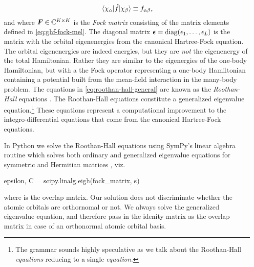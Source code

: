             \begin{align}
                \mel*{\chi_{\alpha}}{\hat{f}}{\chi_{\beta}}
                \equiv f_{\alpha \beta},
                \label{eq:ghf-fock-mel}
            \end{align}
            and where $\boldsymbol{F} \in \mathbb{C}^{K \times K}$ is the \emph{Fock
            matrix} consisting of the matrix elements defined in
            \autoref{eq:ghf-fock-mel}.
            The diagonal matrix $\boldsymbol{\epsilon} = \operatorname{diag}(\epsilon_1, \dots,
            \epsilon_L)$ is the matrix with the orbital eigenenergies from the
            canonical Hartree-Fock equation.
            The orbital eigenenergies are indeed energies, but they are
            \emph{not} the eigenenergy of the total Hamiltonian.
            Rather they are similar to the eigenergies of the one-body
            Hamiltonian, but with a the Fock operator representing a one-body
            Hamiltonian containing a potential built from the mean-field
            interaction in the many-body problem.
            The equations in \autoref{eq:roothan-hall-general} are known as the
            \emph{Roothan-Hall} equations \cite{roothan, hall}.
            The Roothan-Hall equations constitute a generalized eigenvalue
            equation.\footnote{%
                The grammar sounds highly speculative as we talk about the
                Roothan-Hall \emph{equations} reducing to a single
                \emph{equation}.
            }
            These equations represent a computational improvement to the
            integro-differential equations that come from the canonical
            Hartree-Fock equations.

            In Python we solve the Roothan-Hall equations using SymPy's linear
            algebra routine  which solves both ordinary
            and generalized eigenvalue equations for symmetric and Hermitian
            matrices \cite{sympy}, viz.
            \begin{python}
epsilon, C = scipy.linalg.eigh(fock_matrix, s)
            \end{python}
            where  is the overlap matrix.
            Our solution does not discriminate whether the atomic orbitals are
            orthornomal or not.
            We always solve the generalized eigenvalue equation, and therefore
            pass in the idenity matrix as the overlap matrix in case of an
            orthonormal atomic orbital basis.

